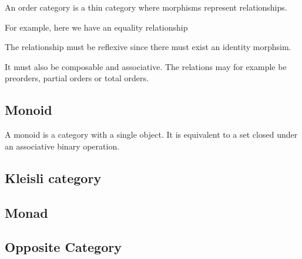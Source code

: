 \documentclass[a4paper]{article}
\begin{document}
An order category is a thin category where morphisms represent relationships.

For example, here we have an equality relationship

\begin{center}
\end{center}

The relationship must be reflexive since there must exist an identity morphsim.

\begin{center}
\end{center}

It must also be composable and associative.
The relations may for example be preorders, partial orders
or total orders.


\subsection{Monoid}

A monoid is a category with a single object.
It is equivalent to a set closed under an associative binary operation. 

\subsection{Kleisli category}


\subsection{Monad}


\subsection{Opposite Category}
\end{document}
